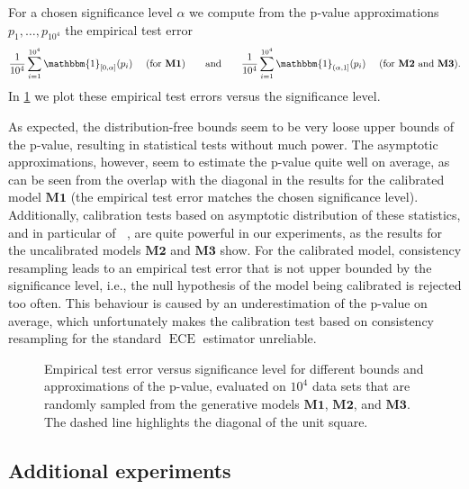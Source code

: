 \documentclass{article}
\DeclareMathOperator{\ECE}{ECE}
\DeclareMathOperator{\unbiasedestimator}{\widehat{SKCE}_{uq}}
\begin{document}
For a chosen significance level $\alpha$ we compute from the p-value
approximations $p_1,\ldots,p_{10^4}$ the empirical test error
\begin{equation*}
  \frac{1}{10^4} \sum_{i=1}^{10^4} \mathbbm{1}_{[0, \alpha]}(p_i) \quad \text{ (for } \mathbf{M1} \text{)}
  \qquad \text{and} \qquad
  \frac{1}{10^4} \sum_{i=1}^{10^4} \mathbbm{1}_{(\alpha, 1]}(p_i) \quad \text{ (for } \mathbf{M2} \text{ and } \mathbf{M3} \text{)}.
\end{equation*}
In \cref{fig:pvalues_comparison} we plot these empirical test errors versus the
significance level.

As expected, the distribution-free bounds seem to be very loose upper bounds of
the p-value, resulting in statistical tests without much power. The asymptotic
approximations, however, seem to estimate the p-value quite well on average, as
can be seen from the overlap with the diagonal in the results for the calibrated
model $\mathbf{M1}$ (the empirical test error matches the chosen significance
level). Additionally, calibration tests based on asymptotic distribution of
these statistics, and in particular of $\unbiasedestimator$, are quite powerful
in our experiments, as the results for the uncalibrated models $\mathbf{M2}$ and
$\mathbf{M3}$ show. For the calibrated model, consistency resampling leads to an
empirical test error that is not upper bounded by the significance level, i.e.,
the null hypothesis of the model being calibrated is rejected too often. This
behaviour is caused by an underestimation of the p-value on average, which
unfortunately makes the calibration test based on consistency resampling for the
standard $\ECE$ estimator unreliable.

\begin{figure}[!htbp]
  \begin{center}
    
    \caption{Empirical test error versus significance level for different
      bounds and approximations of the p-value, evaluated on $10^4$ data sets
      that are randomly sampled from the generative models $\mathbf{M1}$,
      $\mathbf{M2}$, and $\mathbf{M3}$. The dashed line highlights the diagonal
      of the unit square.}
    \label{fig:pvalues_comparison}
  \end{center}
\end{figure}

\subsection{Additional experiments}
\end{document}
